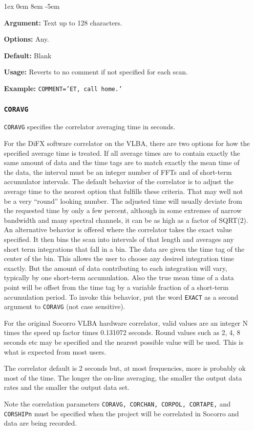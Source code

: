 \documentclass{report}
\newcommand{\rcwbox}[5]{
  \begin{list}{}{\parsep 1ex  \itemsep 0em
                 \leftmargin 8em  \itemindent -5em }
    \item {\bf Argument:} #1
    \item {\bf Options:}  #2
    \item {\bf Default:}  #3
    \item {\bf Usage:}    #4
    \item {\bf Example:}  #5
  \end{list}
}
\begin{document}
\rcwbox
{Text up to 128 characters.}
{Any.}
{Blank}
{Reverts to no comment if not specified for each scan.}
{{\tt COMMENT='ET, call home.'}}


\subsubsection{\label{MP:CORAVG}{\tt CORAVG}}

{\tt CORAVG} specifies the correlator averaging time in seconds.

For the DiFX software correlator on the VLBA, there are two options
for how the specified average time is treated.  If all average times
are to contain exactly the same amount of data and the time tags are
to match exactly the mean time of the data, the interval must be
an integer number of FFTs and of short-term accumulator intervals.
The default behavior of the correlator is to adjust the average time
to the nearest option that fulfills these criteria.  That may well not
be a very ``round'' looking number.  The adjusted time will usually
deviate from the requested time by only a few percent, although in some
extremes of narrow bandwidth and many spectral channels, it can be as
high as a factor of SQRT(2).  An alternative behavior is
offered where the correlator takes the exact value specified.  It then
bins the scan into intervals of that length and averages any short
term integrations that fall in a bin.  The data are given the time
tag of the center of the bin.  This allows the user to choose any
desired integration time exactly.  But the amount of data contributing
to each integration will vary, typically by one short-term
accumulation. Also the true mean time of a data point will be offset
from the time tag by a variable fraction of a short-term accumulation
period.  To invoke this behavior, put the word {\tt EXACT} as a second
argument to {\tt CORAVG} (not case sensitive).

For the original Socorro VLBA hardware correlator, valid values are an
integer N times the speed up factor times 0.131072 seconds.  Round
values such as 2, 4, 8 seconds etc may be specified and the nearest
possible value will be used.  This is what is expected from most
users.

The correlator default is 2 seconds but, at most frequencies, more is
probably ok most of the time.  The longer the on-line averaging, the
smaller the output data rates and the smaller the output data set.

Note the correlation parameters {\tt CORAVG, CORCHAN,
CORPOL, CORTAPE,} and {\tt CORSHIPn} must be specified when
the project will be correlated in Socorro and data
are being recorded.
\end{document}
